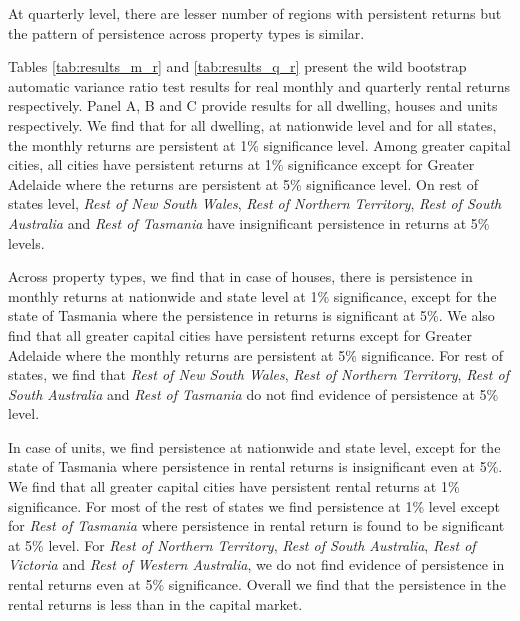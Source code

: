 \documentclass[AEJ,reqno, draftmode]{AEA}
\begin{document}
At quarterly level, there are lesser number of regions with persistent returns but the pattern of persistence across property types is similar.



\restoregeometry


\restoregeometry

Tables \ref{tab:results_m_r} and \ref{tab:results_q_r} present the wild bootstrap automatic variance ratio test results for real monthly and quarterly rental returns respectively. Panel A, B and C provide results for all dwelling, houses and units respectively. We find that for all dwelling, at nationwide  level and for all states, the monthly returns are persistent at 1\% significance level. Among greater capital cities, all cities have persistent returns at 1\% significance except for Greater Adelaide where the returns are persistent at 5\% significance level. On rest of states level, \textit{Rest of New South Wales}, \textit{Rest of Northern Territory}, \textit{Rest of South Australia} and \textit{Rest of Tasmania} have insignificant persistence in returns at 5\% levels. 

Across property types, we find that in case of houses, there is persistence in monthly returns at nationwide and state level at 1\% significance, except for the state of Tasmania where the persistence in returns is significant at 5\%. We also find that all greater capital cities have persistent returns except for Greater Adelaide where the monthly returns are persistent at 5\% significance. For rest of states, we find that \textit{Rest of New South Wales}, \textit{Rest of Northern Territory}, \textit{Rest of South Australia} and \textit{Rest of Tasmania} do not find evidence of persistence at 5\% level.

In case of units, we find persistence at nationwide and state level, except for the state of Tasmania where persistence in rental returns is insignificant even at 5\%. We find that all greater capital cities have persistent rental returns at 1\% significance. For most of the rest of states we find persistence at 1\% level except for \textit{Rest of Tasmania} where persistence in rental return is found to be significant at 5\% level. For \textit{Rest of Northern Territory}, \textit{Rest of South Australia}, \textit{Rest of Victoria} and \textit{Rest of Western Australia}, we do not find evidence of persistence in rental returns even at 5\% significance. Overall we find that the persistence in the rental returns is less than in the capital market.
\end{document}
